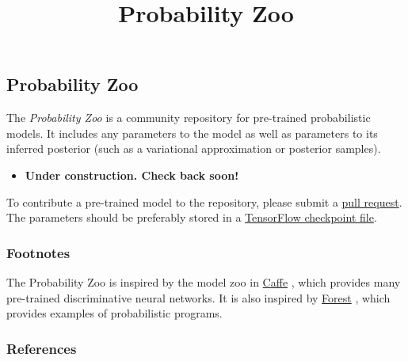 \title{Probability Zoo}

\subsection{Probability Zoo}

The \emph{Probability Zoo} is a community repository for pre-trained
probabilistic models. It includes any parameters to the model as well
as parameters to its inferred posterior (such as a variational
approximation or posterior samples).

\begin{itemize}
\item \textbf{Under construction. Check back soon!}
\end{itemize}

To contribute a pre-trained model to the repository, please submit a
\href{https://github.com/blei-lab/edward/pulls}{pull request}.
The parameters should be preferably stored in a
\href{https://www.tensorflow.org/versions/master/how_tos/variables/}
{TensorFlow checkpoint file}.

\subsubsection{Footnotes}

The Probability Zoo is inspired by the model zoo in
\href{http://caffe.berkeleyvision.org}{Caffe} \citep{jia2014caffe},
which provides many pre-trained discriminative neural networks.
It is also inspired by \href{http://forestdb.org}{Forest}
\citep{stuhlmueller2012forest}, which
provides examples of probabilistic programs.

\subsubsection{References}\label{references}
